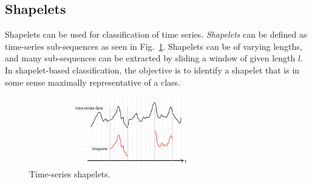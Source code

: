 \documentclass[conference]{IEEEtran}  %
\begin{document}
\subsection{Shapelets}
Shapelets can be used for classification of time series. \textit{Shapelets} can be defined as time-series sub-sequences as seen in Fig.~\ref{fig:shapelets}. 
Shapelets can be of varying lengths, and many sub-sequences can be extracted by sliding a window of given length $l$. In shapelet-based classification, the objective is to identify a shapelet that is in some sense maximally representative of a class.

\begin{figure}
\includegraphics[width=9cm,height=3cm]{shapelet1.png}
\caption{Time-series shapelets.}
\label{fig:shapelets}
\end{figure}
\end{document}
